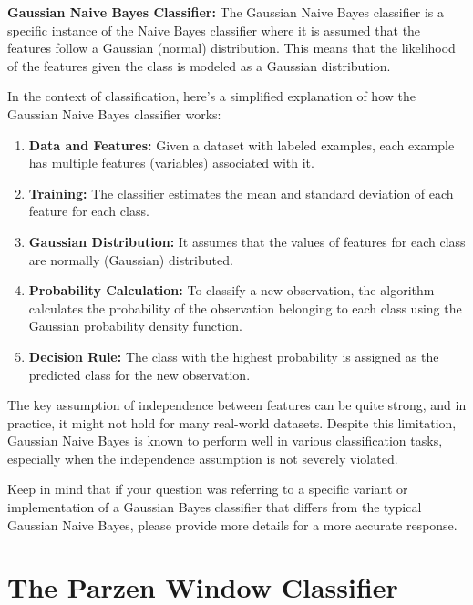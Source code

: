 \documentclass[9pt,twocolumn]{paper-template}
\begin{document}
\textbf{Gaussian Naive Bayes Classifier:}
The Gaussian Naive Bayes classifier is a specific instance of the Naive Bayes classifier where it is assumed that the features follow a Gaussian (normal) distribution. This means that the likelihood of the features given the class is modeled as a Gaussian distribution.

In the context of classification, here's a simplified explanation of how the Gaussian Naive Bayes classifier works:

\begin{enumerate}
	\item \textbf{Data and Features:}
	Given a dataset with labeled examples, each example has multiple features (variables) associated with it.
	
	\item \textbf{Training:}
	The classifier estimates the mean and standard deviation of each feature for each class.
	
	\item \textbf{Gaussian Distribution:}
	It assumes that the values of features for each class are normally (Gaussian) distributed.
	
	\item \textbf{Probability Calculation:}
	To classify a new observation, the algorithm calculates the probability of the observation belonging to each class using the Gaussian probability density function.
	
	\item \textbf{Decision Rule:}
	The class with the highest probability is assigned as the predicted class for the new observation.
\end{enumerate}

The key assumption of independence between features can be quite strong, and in practice, it might not hold for many real-world datasets. Despite this limitation, Gaussian Naive Bayes is known to perform well in various classification tasks, especially when the independence assumption is not severely violated.

Keep in mind that if your question was referring to a specific variant or implementation of a Gaussian Bayes classifier that differs from the typical Gaussian Naive Bayes, please provide more details for a more accurate response.



\section*{The Parzen Window Classifier}
\end{document}
